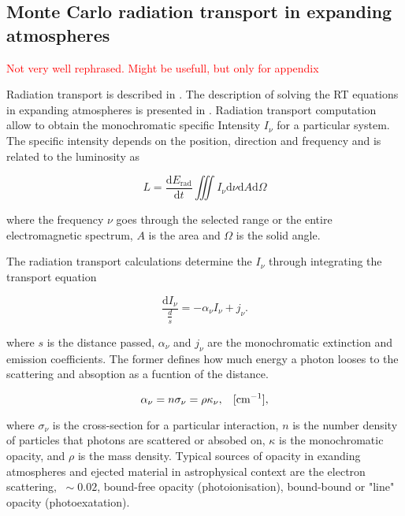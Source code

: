 \documentclass[11pt,a4paper,headinclude=true,DIV=14,BCOR=8mm,chapterprefix,listof=totoc,twoside,openright,abstracton]{scrbook}
\newcommand{\red}[1]{\textcolor{red}{#1}}
\begin{document}

\subsection{Monte Carlo radiation transport in expanding atmospheres}
\red{Not very well rephrased. Might be usefull, but only for appendix}

Radiation transport is described in \cite{Rybicki & Lightman (1986),}.
The description of solving the RT equations in expanding atmospheres is presented in \cite{Kasen et al. (2006).}.
Radiation transport computation allow to obtain the monochromatic specific Intensity $I_{\nu}$ for a particular system. The specific intensity depends on the position, direction and frequency and is related to the luminosity as 

\begin{equation}
    L = \frac{\text{d}E_{\text{rad}}}{\text{d}t}\iiint I_{\nu} \text{d}\nu \text{d}A \text{d} \Omega
\end{equation}

where the frequency $\nu$ goes through the selected range or the entire electromagnetic spectrum, $A$ is the area and $\Omega$ is the solid angle. 

The radiation transport calculations determine the $I_{\nu}$ through integrating the transport equation 

\begin{equation}
    \frac{\text{d}I_{\nu}}{\frac{d}s} = -\alpha_{\nu} I_{\nu} + j_{\nu}.
\end{equation}

where $s$ is the distance passed, $\alpha_{\nu}$ and $j_{\nu}$ are the monochromatic extinction and emission coefficients. The former defines how much energy a photon looses to the scattering and absoption as a fucntion of the distance. 

\begin{equation}
    \alpha_{\nu} = n\sigma_{\nu} = \rho\kappa_{\nu}, \hspace{3mm} [\text{cm}^{-1}],
\end{equation}

where $\sigma_{\nu}$ is the cross-section for a particular interaction, $n$ is the number density of particles that photons are scattered or absobed on, $\kappa$ is the monochromatic opacity, and $\rho$ is the mass density. 
Typical sources of opacity in exanding atmospheres and ejected material in astrophysical context are the electron scattering, $~\sim  0.02$, bound-free opacity (photoionisation), bound-bound or "line" opacity (photoexatation).
\end{document}
